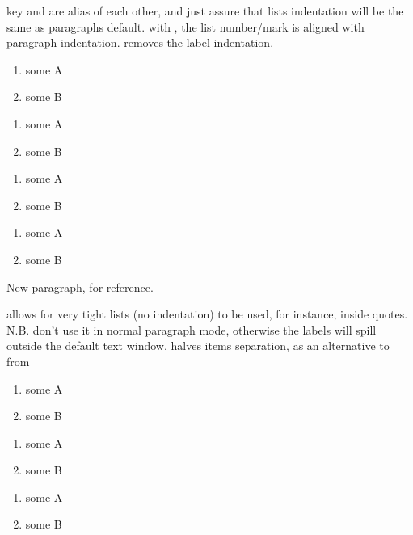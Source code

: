 \documentclass[article,nofontwarning,nogeometry,english,tocdepth=3,secdepth=3]{ufrgscca} %
\begin{document}
\begin{describelist}{key}
	 { and  are alias of each other, and just assure that lists indentation will be the same as paragraphs default.}
	 {with , the list number/mark is aligned with paragraph indentation.}
	 { removes the label indentation.}

	\begin{codestore}[st=enumA]
\begin{enumerate}[tcc]
	\item some A
	\item some B
\end{enumerate}
\begin{enumerate}
	\item some A
	\item some B
\end{enumerate}
\begin{enumerate}[parindent]
	\item some A
	\item some B
\end{enumerate}
\begin{enumerate}[noindent]
	\item some A
	\item some B
\end{enumerate}

New paragraph, for reference.
\end{codestore}


	 {allows for very tight lists (no indentation) to be used, for instance, inside quotes. N.B. don't use it in normal paragraph mode, otherwise the labels will spill outside the default text window.}
	 { halves items separation, as an alternative to  from }
	\begin{codestore}[st=enumB]
	\begin{enumerate}[tcc]
		\item some A
		\item some B
	\end{enumerate}
	\begin{enumerate}
		\item some A
		\item some B
	\end{enumerate}
	\begin{enumerate}
		\item some A
		\item some B
	\end{enumerate}
\end{codestore}
\newpage
{}



\end{describelist}
\end{document}
